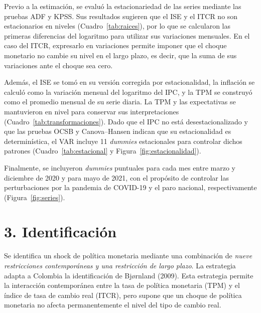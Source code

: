 \documentclass[12pt,letterpaper]{article}
\begin{document}
Previo a la estimación, se evaluó la estacionariedad de las series mediante las pruebas ADF y KPSS. Sus resultados sugieren que el ISE y el ITCR no son estacionarios en niveles (Cuadro~\ref{tab:raices}), por lo que se calcularon las primeras diferencias del logaritmo para utilizar sus variaciones mensuales. En el caso del ITCR, expresarlo en variaciones permite imponer que el choque monetario no cambie su nivel en el largo plazo, es decir, que la suma de sus variaciones ante el choque sea cero. 

Además, el ISE se tomó en su versión corregida por estacionalidad, la inflación se calculó como la variación mensual del logaritmo del IPC, y la TPM se construyó como el promedio mensual de su serie diaria. La TPM y las expectativas se mantuvieron en nivel para conservar sus interpretaciones (Cuadro~\ref{tab:transformaciones}). Dado que el IPC no está desestacionalizado y que las pruebas OCSB y Canova--Hansen indican que su estacionalidad es determinística, el VAR incluye 11 \textit{dummies} estacionales para controlar dichos patrones (Cuadro~\ref{tab:estacional} y Figura~\ref{fig:estacionalidad}).

Finalmente, se incluyeron \textit{dummies} puntuales para cada mes entre marzo y diciembre de 2020 y para mayo de 2021, con el propósito de controlar las perturbaciones por la pandemia de COVID-19 y el paro nacional, respectivamente (Figura~\ref{fig:series}).






\section*{3. Identificaci\'on}

Se identifica un shock de política monetaria mediante una combinación de \emph{nueve restricciones contemporáneas y una restricción de largo plazo}. La estrategia adapta a Colombia la identificación de Bj{\o}rnland (2009). Esta estrategia permite la interacción contemporánea entre la tasa de política monetaria (TPM) y el índice de tasa de cambio real (ITCR), pero supone que un choque de política monetaria no afecta permanentemente el nivel del tipo de cambio real.
\end{document}
